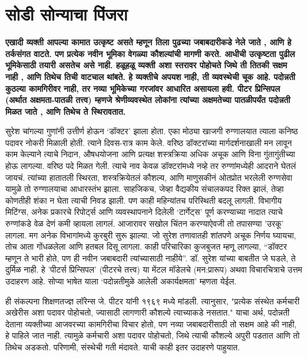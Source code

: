\chapter{सोडी सोन्याचा पिंजरा}

\textcolor{blue!60!black}{\textbf{एखादी व्यक्ती आपल्या कामात उत्कृष्ट असते म्हणून तिला पुढच्या जबाबदारीकडे नेले जाते , आणि हे तर्कसंगत वाटते. पण प्रत्येक नवीन भूमिका वेगळ्या कौशल्यांची मागणी करते. आधीची उत्कृष्टता पुढील भूमिकेसाठी तयारी असतेच असे नाही. हळूहळू व्यक्ती अशा स्तरावर पोहोचते जिथे ती तितकी सक्षम नाही , आणि तिथेच तिची वाटचाल थांबते. हे व्यक्तीचे अपयश नाही, ती व्यवस्थेची चूक आहे. पदोन्नती कुठल्या कामगिरीवर नाही, तर नव्या भूमिकेच्या गरजांवर आधारित असायला हवी. पीटर प्रिन्सिपल (अर्थात अक्षमता-पातळी तत्त्व) म्हणजे श्रेणीव्यवस्थेत लोकांना त्यांच्या अक्षमतेच्या पातळीपर्यंत पदोन्नती मिळत जाते , आणि तिथेच ते स्थिरावतात.}}

सुरेश चांगल्या गुणांनी उत्तीर्ण होऊन ‘डॉक्टर’ झाला होता. एका मोठ्या खाजगी रुग्णालयात त्याला कनिष्ठ पदावर नोकरी मिळाली होती. त्याने दिवस-रात्र काम केले. वरिष्ठ डॉक्टरांच्या मार्गदर्शनाखाली मन लावून काम केल्याने त्याचे निदान, औषधयोजना आणि प्रत्यक्ष शस्त्रक्रिया अधिक अचूक आणि विना गुंतागुंतीच्या होऊ लागल्या. वरिष्ठ पदे मिळत गेली. त्याचे नाव केवळ डॉक्टरांमध्ये नव्हे तर रुग्णांमध्येही आदराने घेतलं जायचं. त्यांच्या हातातली स्थिरता, शस्त्रक्रियेतलं कौशल्य, आणि माणुसकीनं ओतप्रोत भरलेली रुग्णसेवा यामुळे तो रुग्णालयाचा आधारस्तंभ झाला. साहजिकच, जेव्हा वैद्यकीय संचालकपद रिक्त झालं, तेव्हा कोणतीही शंका न घेता त्याची निवड झाली. पण काही महिन्यांतच परिस्थिती बदलू लागली. विभागीय मिटिंग्स, अनेक प्रकारचे रिपोर्ट्स आणि व्यवस्थापनाने दिलेली ‘टार्गेट्स’ पूर्ण करण्याच्या नादात त्याचे रुग्णांकडे वेळ देणं कमी व्हायला लागलं. आजारावर सखोल चिंतन करण्याऐवजी तो तपासण्या 'उरकू' लागला. मग अनेक विभागांमध्ये कुरबुरी सुरू झाल्या. जो सुरेश तणावातही शांतपणे अचूक निर्णय घ्यायचा, तोच आता गोंधळलेला आणि हतबल दिसू लागला. काही परिचारिका कुजबुजत म्हणू लागल्या, “डॉक्टर म्हणून ते भारी होते, पण ही नवीन जबाबदारी त्यांच्यासाठी नाहीये”. डॉ. सुरेश यांच्या बाबतीत जे घडले, ते दुर्मिळ नाही. हे 'पीटर्स प्रिन्सिपल' (पीटरचे तत्त्व) या मेंटल मॉडेलचे (मन:प्रारूप) अथवा विचारचित्राचे  उत्तम उदाहरण आहे. सोप्या भाषेत याला ‘पदोन्नतीमुळे आलेली अकार्यक्षमता’ म्हणता येईल.

ही संकल्पना शिक्षणतज्ज्ञ लॉरेन्स जे. पीटर यांनी १९६९ मध्ये मांडली. त्यानुसार, "प्रत्येक संस्थेत कर्मचारी अखेरीस अशा पदावर पोहोचतो, ज्यासाठी लागणारी कौशल्ये त्याच्याकडे नसतात." याचा अर्थ, पदोन्नती देताना व्यक्तीच्या आजवरच्या कामगिरीचा विचार होतो, पण नव्या जबाबदारीसाठी तो सक्षम आहे की नाही, हे पाहिले जात नाही. त्यामुळे कर्मचारी अशा पदावर पोहोचतो, जिथे त्याची कौशल्ये अपुरी पडतात आणि तो तिथेच अडकतो. परिणामी, संस्थेची गती मंदावते. याची काही इतर उदाहरणे पाहुयात. 

